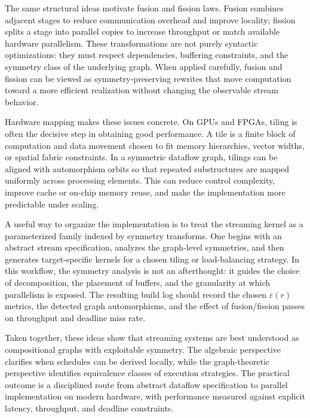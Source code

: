 \documentclass[11pt]{article}
\begin{document}
The same structural ideas motivate fusion and fission laws. Fusion combines adjacent stages to reduce communication overhead and improve locality; fission splits a stage into parallel copies to increase throughput or match available hardware parallelism. These transformations are not purely syntactic optimizations: they must respect dependencies, buffering constraints, and the symmetry class of the underlying graph. When applied carefully, fusion and fission can be viewed as symmetry-preserving rewrites that move computation toward a more efficient realization without changing the observable stream behavior.

Hardware mapping makes these issues concrete. On GPUs and FPGAs, tiling is often the decisive step in obtaining good performance. A tile is a finite block of computation and data movement chosen to fit memory hierarchies, vector widths, or spatial fabric constraints. In a symmetric dataflow graph, tilings can be aligned with automorphism orbits so that repeated substructures are mapped uniformly across processing elements. This can reduce control complexity, improve cache or on-chip memory reuse, and make the implementation more predictable under scaling.

A useful way to organize the implementation is to treat the streaming kernel as a parameterized family indexed by symmetry transforms. One begins with an abstract stream specification, analyzes the graph-level symmetries, and then generates target-specific kernels for a chosen tiling or load-balancing strategy. In this workflow, the symmetry analysis is not an afterthought: it guides the choice of decomposition, the placement of buffers, and the granularity at which parallelism is exposed. The resulting build log should record the chosen \(\varepsilon(r)\) metrics, the detected graph automorphisms, and the effect of fusion/fission passes on throughput and deadline miss rate.

Taken together, these ideas show that streaming systems are best understood as compositional graphs with exploitable symmetry. The algebraic perspective clarifies when schedules can be derived locally, while the graph-theoretic perspective identifies equivalence classes of execution strategies. The practical outcome is a disciplined route from abstract dataflow specification to parallel implementation on modern hardware, with performance measured against explicit latency, throughput, and deadline constraints.
\end{document}
